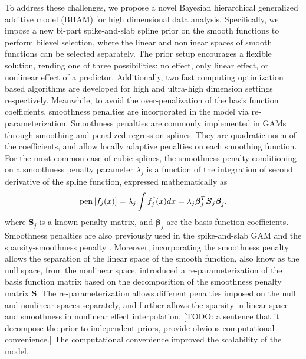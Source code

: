 \documentclass[AMA,STIX1COL,]{WileyNJD-v2}
\begin{document}
To address these challenges, we propose a novel Bayesian hierarchical
generalized additive model (BHAM) for high dimensional data analysis.
Specifically, we impose a new bi-part spike-and-slab spline prior on the
smooth functions to perform bilevel selection, where the linear and
nonlinear spaces of smooth functions can be selected separately. The
prior setup encourages a flexible solution, rending one of three
possibilities: no effect, only linear effect, or nonlinear effect of a
predictor. Additionally, two fast computing optimization based
algorithms are developed for high and ultra-high dimension settings
respectively. Meanwhile, to avoid the over-penalization of the basis
function coefficients, smoothness penalties are incorporated in the
model via re-parameterization. Smoothness penalties are commonly
implemented in GAMs through smoothing and penalized regression splines.
They are quadratic norm of the coefficients, and allow locally adaptive
penalties on each smoothing function. For the most common case of cubic
splines, the smoothness penalty conditioning on a smoothness penalty
parameter \(\lambda_j\) is a function of the integration of second
derivative of the spline function, expressed mathematically as
\begin{equation}\label{eq:smoothpen}
  \text{pen}\left[f_j(x)\right] = \lambda_j \int f^{"}_j(x)dx = \lambda_j \boldsymbol{\beta}_j^T \boldsymbol{S}_j \boldsymbol{\beta}_j ,
\end{equation} where \(\boldsymbol{S}_j\) is a known penalty matrix, and
\(\boldsymbol{\beta}_j\) are the basis function coefficients. Smoothness
penalties are also previously used in the spike-and-slab GAM
\citep{Scheipl2012} and the sparsity-smoothness penalty
\citep{Meier2009}. Moreover, incorporating the smoothness penalty allows
the separation of the linear space of the smooth function, also know as
the null space, from the nonlinear space. \citet{Marra2011} introduced a
re-parameterization of the basis function matrix based on the
decomposition of the smoothness penalty matrix \(\boldsymbol{S}\). The
re-parameterization allows different penalties imposed on the null and
nonlinear spaces separately, and further allows the sparsity in linear
space and smoothness in nonlinear effect interpolation. {[}TODO: a
sentence that it decompose the prior to independent priors, provide
obvious computational convenience.{]} The computational convenience
improved the scalability of the model.
\end{document}
